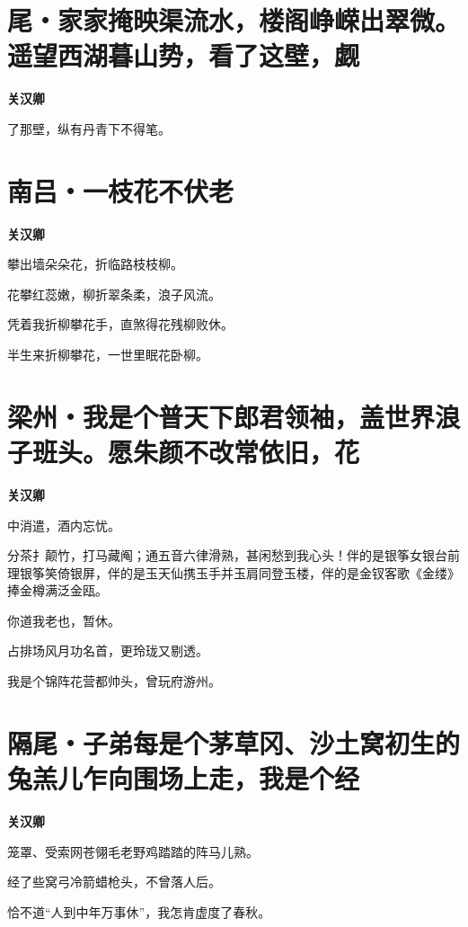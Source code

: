\documentclass[12pt,a4paper]{ctexbook}
\begin{document}
\section{尾・家家掩映渠流水，楼阁峥嵘出翠微。遥望西湖暮山势，看了这壁，觑}
\textbf{关汉卿}\par\vspace{0.5em}
了那壁，纵有丹青下不得笔。\par

\section{南吕・一枝花不伏老}
\textbf{关汉卿}\par\vspace{0.5em}
攀出墙朵朵花，折临路枝枝柳。\par
花攀红蕊嫩，柳折翠条柔，浪子风流。\par
凭着我折柳攀花手，直煞得花残柳败休。\par
半生来折柳攀花，一世里眠花卧柳。\par

\section{梁州・我是个普天下郎君领袖，盖世界浪子班头。愿朱颜不改常依旧，花}
\textbf{关汉卿}\par\vspace{0.5em}
中消遣，酒内忘忧。\par
分茶扌颠竹，打马藏阄；通五音六律滑熟，甚闲愁到我心头！伴的是银筝女银台前理银筝笑倚银屏，伴的是玉天仙携玉手并玉肩同登玉楼，伴的是金钗客歌《金缕》捧金樽满泛金瓯。\par
你道我老也，暂休。\par
占排场风月功名首，更玲珑又剔透。\par
我是个锦阵花营都帅头，曾玩府游州。\par

\section{隔尾・子弟每是个茅草冈、沙土窝初生的兔羔儿乍向围场上走，我是个经}
\textbf{关汉卿}\par\vspace{0.5em}
笼罩、受索网苍翎毛老野鸡踏踏的阵马儿熟。\par
经了些窝弓冷箭蜡枪头，不曾落人后。\par
恰不道“人到中年万事休”，我怎肯虚度了春秋。\par
\end{document}
